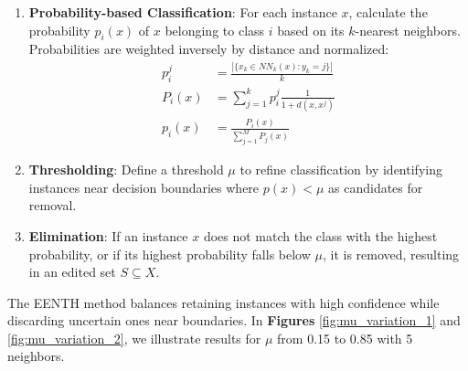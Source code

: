 \begin{enumerate}
	\item \textbf{Probability-based Classification}: For each instance $x$, calculate the probability $p_i(x)$ of $x$ belonging to class $i$ based on its $k$-nearest neighbors. Probabilities are weighted inversely by distance and normalized:
	\begin{align}
		p_i^j &= \frac{|\{x_k \in NN_k(x) : y_k = j \}|}{k} \\
		P_i(x) &= \sum_{j=1}^{k} p_i^j \frac{1}{1 + d(x, x^j)} \\
		p_i(x) &= \frac{P_i(x)}{\sum_{j=1}^{M} P_j(x)}
	\end{align}
	
	\item \textbf{Thresholding}: Define a threshold $\mu$ to refine classification by identifying instances near decision boundaries where $p(x) < \mu$ as candidates for removal.
	
	\item \textbf{Elimination}: If an instance $x$ does not match the class with the highest probability, or if its highest probability falls below $\mu$, it is removed, resulting in an edited set $S \subseteq X$.
\end{enumerate}

The EENTH method balances retaining instances with high confidence while discarding uncertain ones near boundaries. In \textbf{Figures} \ref{fig:mu_variation_1} and \ref{fig:mu_variation_2}, we illustrate results for $\mu$ from 0.15 to 0.85 with 5 neighbors.

